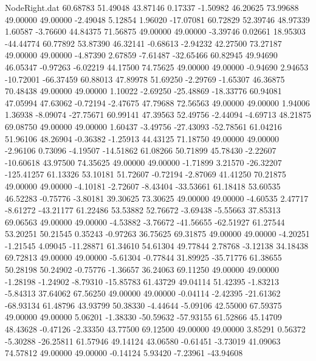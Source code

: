 \begin{filecontents}{NodeRight.dat}
  60.68783   51.49048   43.87146     0.17337   -1.50982   46.20625   73.99688   49.00000   49.00000   -2.49048    5.12854    1.96020  -17.07081
  60.72829   52.39746   48.97339     1.60587   -3.76600   44.84375   71.56875   49.00000   49.00000   -3.39746    0.02661   18.95303  -44.44774
  60.77892   53.87390   46.32141    -0.68613   -2.94232   42.27500   73.27187   49.00000   49.00000   -4.87390    2.67859   -7.61487  -32.65466
  60.82945   49.94690   46.05347    -0.97263   -6.02219   44.17500   74.75625   49.00000   49.00000   -0.94690    2.94653  -10.72001  -66.37459
  60.88013   47.89978   51.69250    -2.29769   -1.65307   46.36875   70.48438   49.00000   49.00000    1.10022   -2.69250  -25.48869  -18.33776
  60.94081   47.05994   47.63062    -0.72194   -2.47675   47.79688   72.56563   49.00000   49.00000    1.94006    1.36938   -8.09074  -27.75671
  60.99141   47.39563   52.49756    -2.44094   -4.69713   48.21875   69.08750   49.00000   49.00000    1.60437   -3.49756  -27.43093  -52.78561
  61.04216   51.96106   48.26904    -0.36382   -1.25913   44.43125   71.18750   49.00000   49.00000   -2.96106    0.73096   -4.19507  -14.51862
  61.08266   50.71899   45.78430    -2.22607  -10.60618   43.97500   74.35625   49.00000   49.00000   -1.71899    3.21570  -26.32207 -125.41257
  61.13326   53.10181   51.72607    -0.72194   -2.87069   41.41250   70.21875   49.00000   49.00000   -4.10181   -2.72607   -8.43404  -33.53661
  61.18418   53.60535   46.52283    -0.75776   -3.80181   39.30625   73.30625   49.00000   49.00000   -4.60535    2.47717   -8.61272  -43.21177
  61.22486   53.53882   52.76672    -3.69438   -5.55663   37.85313   69.06563   49.00000   49.00000   -4.53882   -3.76672  -41.56655  -62.51927
  61.27544   53.20251   50.21545     0.35243   -0.97263   36.75625   69.31875   49.00000   49.00000   -4.20251   -1.21545    4.09045  -11.28871
  61.34610   54.61304   49.77844     2.78768   -3.12138   34.18438   69.72813   49.00000   49.00000   -5.61304   -0.77844   31.89925  -35.71776
  61.38655   50.28198   50.24902    -0.75776   -1.36657   36.24063   69.11250   49.00000   49.00000   -1.28198   -1.24902   -8.79310  -15.85783
  61.43729   49.04114   51.42395    -1.83213   -5.84313   37.64062   67.56250   49.00000   49.00000   -0.04114   -2.42395  -21.61362  -68.93134
  61.48796   43.93799   50.38330    -4.44644   -5.09106   42.55000   67.59375   49.00000   49.00000    5.06201   -1.38330  -50.59632  -57.93155
  61.52866   45.14709   48.43628    -0.47126   -2.33350   43.77500   69.12500   49.00000   49.00000    3.85291    0.56372   -5.30288  -26.25811
  61.57946   49.14124   43.06580    -0.61451   -3.73019   41.09063   74.57812   49.00000   49.00000   -0.14124    5.93420   -7.23961  -43.94608

\end{filecontents}
